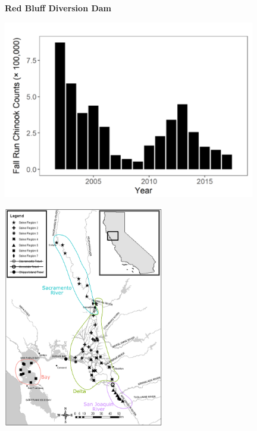\documentclass[]{article}\usepackage[]{graphicx}\usepackage[]{color}
\begin{document}
\vspace{1cm}

\begin{Row}
  \begin{Cell}{7}
    \begin{center}
      {\bf {\large Red Bluff Diversion Dam}}
    \end{center}
  \end{Cell}
  \begin{Cell}{6}
  \end{Cell}
\end{Row}

\begin{Row}
  \begin{Cell}{7}
    \begin{center}
      \includegraphics[width=11cm,trim=0 0 0 40,clip,align=m]{figures/salmon/red_bluff_tmp.png}
    \end{center}
  \end{Cell}
  \begin{Cell}{6}
    \vspace{-2cm}
    \begin{center}
      \includegraphics[width=7cm,align=m]{figures/salmon/djfmp_map_tmp_2.png}
    \end{center}
  \end{Cell}
\end{Row}
\end{document}
